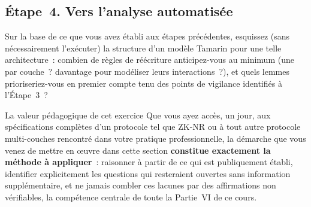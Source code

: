 \subsection{Étape~4. Vers l'analyse automatisée}

Sur la base de ce que vous avez établi aux étapes précédentes,
esquissez (sans nécessairement l'exécuter) la structure d'un modèle
Tamarin pour une telle architecture~: combien de règles de
réécriture anticipez-vous au minimum (une par couche~? davantage
pour modéliser leurs interactions~?), et quels lemmes prioriseriez-vous
en premier compte tenu des points de vigilance identifiés à
l'Étape~3~?

\begin{boiteRemarque}{La valeur pédagogique de cet exercice}
Que vous ayez accès, un jour, aux spécifications complètes d'un
protocole tel que ZK-NR ou à tout autre protocole multi-couches
rencontré dans votre pratique professionnelle, la démarche que
vous venez de mettre en \oe uvre dans cette section
\textbf{constitue exactement la méthode à appliquer}~:
raisonner à partir de ce qui est publiquement établi, identifier
explicitement les questions qui resteraient ouvertes sans
information supplémentaire, et ne jamais combler ces lacunes par
des affirmations non vérifiables, la compétence centrale de
toute la Partie~VI de ce cours.
\end{boiteRemarque}

\separateur

